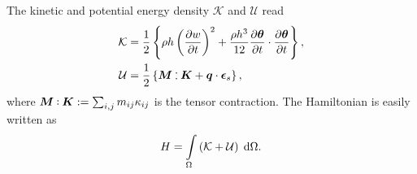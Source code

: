 \documentclass{ifacconf}
\def\onedot{$\mathsurround0pt\ldotp$}
\def\cddot{%
	\mathbin{\vcenter{\baselineskip.67ex
			\hbox{\onedot}\hbox{\onedot}}%
}}
\begin{document}
The kinetic and potential energy density $\mathcal{K}$ and $\mathcal{U}$ read
\begin{equation}
\begin{aligned}
\mathcal{K} &=  \frac{1}{2} \left\{ \rho h \left(\diffp{w}{t} \right)^2 +  \frac{\rho h^3}{12} \diffp{\bm{\theta}}{t} \cdot \diffp{\bm{\theta}}{t}  \right\}, \\
\mathcal{U} &= \frac{1}{2} \left\{ \bm{M} \cddot \bm{K} + \bm{q} \cdot \bm{\epsilon}_s  \right\},
\end{aligned}
\end{equation} 
where $\bm{M} \cddot \bm{K} := \sum_{i,j} m_{ij} \kappa_{ij}$ is the tensor contraction. The Hamiltonian  is easily written as
\begin{equation} 
H = \int_{\Omega} \left( \mathcal{K} + \mathcal{U} \right)   \d\Omega. 
\end{equation}
\end{document}
